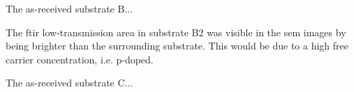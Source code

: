 
The as-received substrate B...

The \ac{ftir} low-transmission area in substrate B2 was visible in the \ac{sem} images by being brighter than the surrounding substrate. This would be due to a high free carrier concentration, i.e. p-doped.

The as-received substrate C...




